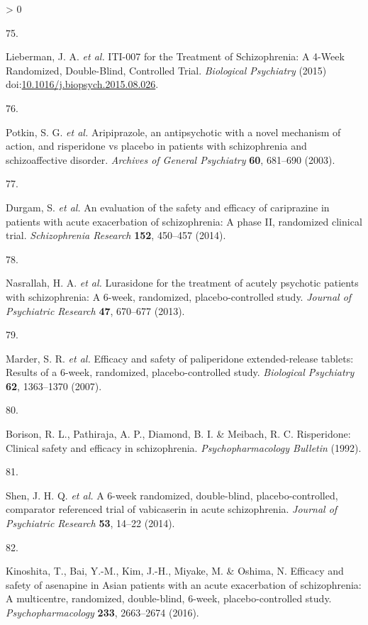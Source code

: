 \documentclass[
  9pt,
  english,
  ,jou,floatsintext]{apa6}
\newlength{\cslhangindent}
\newlength{\csllabelwidth}
\newenvironment{CSLReferences}[2] %
 {%
  \setlength{\parindent}{0pt}
  \ifodd #1 \everypar{\setlength{\hangindent}{\cslhangindent}}\ignorespaces\fi
  \ifnum #2 > 0
  \setlength{\parskip}{#2\baselineskip}
  \fi
 }%
 {}
\newcommand{\CSLLeftMargin}[1]{\parbox[t]{\csllabelwidth}{#1}}
\newcommand{\CSLRightInline}[1]{\parbox[t]{\linewidth - \csllabelwidth}{#1}\break}
\begin{document}
\begin{CSLReferences}{0}{0}
\leavevmode\hypertarget{ref-Lieberman2015}{}%
\CSLLeftMargin{75. }
\CSLRightInline{Lieberman, J. A. \emph{et al.} {ITI}-007 for the {Treatment} of {Schizophrenia}: {A} 4-{Week} {Randomized}, {Double}-{Blind}, {Controlled} {Trial}. \emph{Biological Psychiatry} (2015) doi:\href{https://doi.org/10.1016/j.biopsych.2015.08.026}{10.1016/j.biopsych.2015.08.026}.}

\leavevmode\hypertarget{ref-Potkin2003}{}%
\CSLLeftMargin{76. }
\CSLRightInline{Potkin, S. G. \emph{et al.} Aripiprazole, an antipsychotic with a novel mechanism of action, and risperidone vs placebo in patients with schizophrenia and schizoaffective disorder. \emph{Archives of General Psychiatry} \textbf{60}, 681--690 (2003).}

\leavevmode\hypertarget{ref-Durgam2014}{}%
\CSLLeftMargin{77. }
\CSLRightInline{Durgam, S. \emph{et al.} An evaluation of the safety and efficacy of cariprazine in patients with acute exacerbation of schizophrenia: A phase {II}, randomized clinical trial. \emph{Schizophrenia Research} \textbf{152}, 450--457 (2014).}

\leavevmode\hypertarget{ref-Nasrallah2013}{}%
\CSLLeftMargin{78. }
\CSLRightInline{Nasrallah, H. A. \emph{et al.} Lurasidone for the treatment of acutely psychotic patients with schizophrenia: A 6-week, randomized, placebo-controlled study. \emph{Journal of Psychiatric Research} \textbf{47}, 670--677 (2013).}

\leavevmode\hypertarget{ref-Marder2007}{}%
\CSLLeftMargin{79. }
\CSLRightInline{Marder, S. R. \emph{et al.} Efficacy and safety of paliperidone extended-release tablets: Results of a 6-week, randomized, placebo-controlled study. \emph{Biological Psychiatry} \textbf{62}, 1363--1370 (2007).}

\leavevmode\hypertarget{ref-Borison1992}{}%
\CSLLeftMargin{80. }
\CSLRightInline{Borison, R. L., Pathiraja, A. P., Diamond, B. I. \& Meibach, R. C. Risperidone: Clinical safety and efficacy in schizophrenia. \emph{Psychopharmacology Bulletin} (1992).}

\leavevmode\hypertarget{ref-Shen2014}{}%
\CSLLeftMargin{81. }
\CSLRightInline{Shen, J. H. Q. \emph{et al.} A 6-week randomized, double-blind, placebo-controlled, comparator referenced trial of vabicaserin in acute schizophrenia. \emph{Journal of Psychiatric Research} \textbf{53}, 14--22 (2014).}

\leavevmode\hypertarget{ref-Kinoshita2016}{}%
\CSLLeftMargin{82. }
\CSLRightInline{Kinoshita, T., Bai, Y.-M., Kim, J.-H., Miyake, M. \& Oshima, N. Efficacy and safety of asenapine in {Asian} patients with an acute exacerbation of schizophrenia: A multicentre, randomized, double-blind, 6-week, placebo-controlled study. \emph{Psychopharmacology} \textbf{233}, 2663--2674 (2016).}


\end{CSLReferences}
\end{document}
